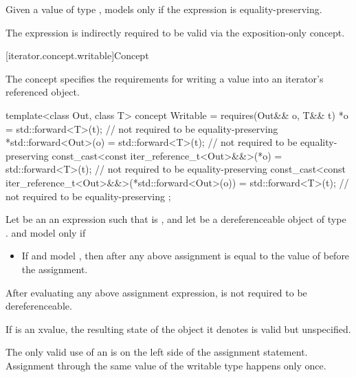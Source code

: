 \pnum
Given a value  of type ,  models 
only if the expression  is equality-preserving.
\begin{note}
The expression  is indirectly required to be valid via the
exposition-only  concept.
\end{note}

[iterator.concept.writable]{Concept }

\pnum
The  concept specifies the requirements for writing a value
into an iterator's referenced object.

%
\begin{codeblock}
template<class Out, class T>
  concept Writable =
    requires(Out&& o, T&& t) {
      *o = std::forward<T>(t); // not required to be equality-preserving
      *std::forward<Out>(o) = std::forward<T>(t); // not required to be equality-preserving
      const_cast<const iter_reference_t<Out>&&>(*o) =
        std::forward<T>(t); // not required to be equality-preserving
      const_cast<const iter_reference_t<Out>&&>(*std::forward<Out>(o)) =
        std::forward<T>(t); // not required to be equality-preserving
    };
\end{codeblock}

\pnum
Let  be an an expression such that  is ,
and let  be a dereferenceable object of type .
 and  model  only if

\begin{itemize}
\item If  and  model
  ,
  then  after any above assignment is equal to
  the value of  before the assignment.
\end{itemize}

\pnum
After evaluating any above assignment expression,  is not required to be dereferenceable.

\pnum
If  is an xvalue, the resulting
state of the object it denotes is valid but unspecified.

\pnum
\begin{note}
The only valid use of an  is on the left side of the assignment statement.
Assignment through the same value of the writable type happens only once.
\end{note}

